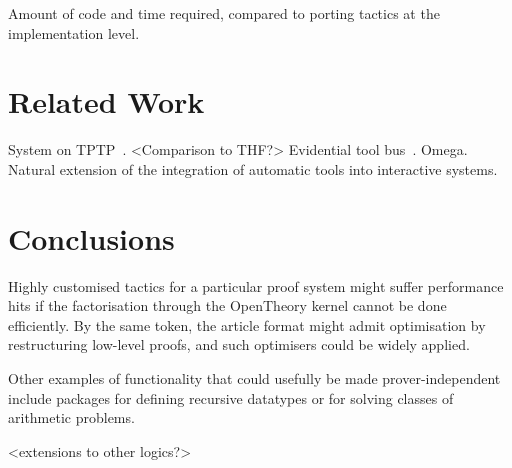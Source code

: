 \documentclass{llncs}
\begin{document}
Amount of code and time required, compared to porting tactics at the implementation level.

\section{Related Work}

System on TPTP~\cite{DBLP:conf/lpar/Sutcliffe10}.
<Comparison to THF?>
Evidential tool bus~\cite{DBLP:conf/icfem/Rushby05,fk:etb}.
Omega.
Natural extension of the integration of automatic tools into interactive systems.

\section{Conclusions}

Highly customised tactics for a particular proof system might suffer performance hits if the factorisation through the OpenTheory kernel cannot be done efficiently.
By the same token, the article format might admit optimisation by restructuring low-level proofs, and such optimisers could be widely applied.

Other examples of functionality that could usefully be made prover-independent include packages for defining recursive datatypes or for solving classes of arithmetic problems.

<extensions to other logics?>



\end{document}
